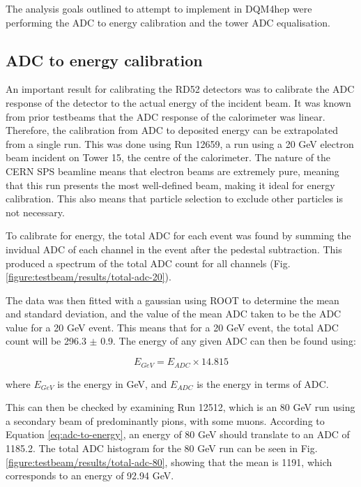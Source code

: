 The analysis goals outlined to attempt to implement in \acrshort{DQM4hep} were performing the \acrshort{ADC} to energy calibration and the tower \acrshort{ADC} equalisation.

\subsection{ADC to energy calibration}
An important result for calibrating the RD52 detectors was to calibrate the \acrshort{ADC} response of the detector to the actual energy of the incident beam. It was known from prior testbeams that the \acrshort{ADC} response of the calorimeter was linear. Therefore, the calibration from \acrshort{ADC} to deposited energy can be extrapolated from a single run. This was done using Run 12659, a run using a 20 GeV electron beam incident on Tower 15, the centre of the calorimeter. The nature of the \acrshort{CERN} \acrshort{SPS} beamline means that electron beams are extremely pure, meaning that this run presents the most well-defined beam, making it ideal for energy calibration. This also means that particle selection to exclude other particles is not necessary.

To calibrate for energy, the total \acrshort{ADC} for each event was found by summing the invidual \acrshort{ADC} of each channel in the event after the pedestal subtraction. This produced a spectrum of the total \acrshort{ADC} count for all channels (Fig. \ref{figure:testbeam/results/total-adc-20}).

The data was then fitted with a gaussian using ROOT to determine the mean and standard deviation, and the value of the mean \acrshort{ADC} taken to be the \acrshort{ADC} value for a 20 GeV event. This means that for a 20 GeV event, the total \acrshort{ADC} count will be 296.3 $\pm$ 0.9. The energy of any given ADC can then be found using:

\begin{equation}
	E_{GeV} = E_{ADC} \times 14.815
\label{eq:adc-to-energy}
\end{equation}

where $E_{GeV}$ is the energy in GeV, and $E_{ADC}$ is the energy in terms of ADC.

This can then be checked by examining Run 12512, which is an 80 GeV run using a secondary beam of predominantly pions, with some muons. According to Equation \ref{eq:adc-to-energy}, an energy of 80 GeV should translate to an ADC of 1185.2. The total ADC histogram for the 80 GeV run can be seen in Fig. \ref{figure:testbeam/results/total-adc-80}, showing that the mean is 1191, which corresponds to an energy of 92.94 GeV.

